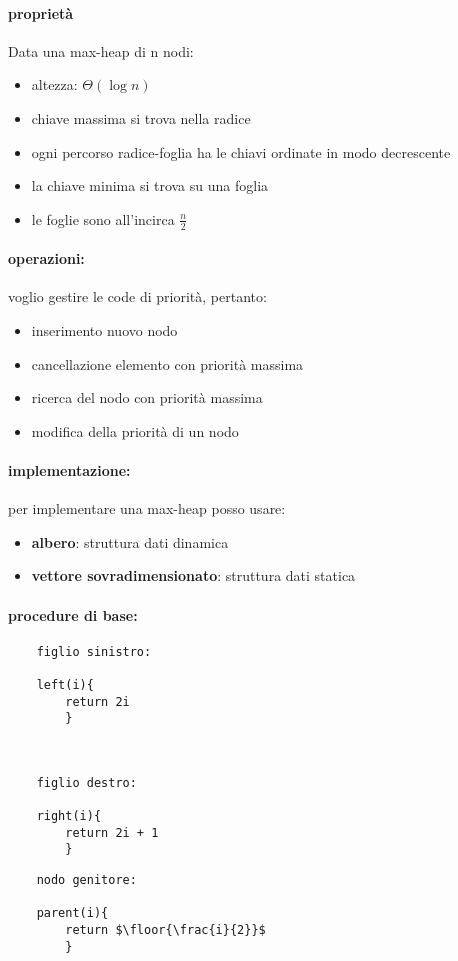 \documentclass{article}
\DeclarePairedDelimiter\floor{\lfloor}{\rfloor}
\begin{document}
\paragraph{proprietà} 
Data una max-heap di n nodi:
\begin{itemize}
    \item altezza: $\Theta(\log n)$
    \item chiave massima si trova nella radice
    \item ogni percorso radice-foglia ha le chiavi ordinate in modo decrescente
    \item la chiave minima si trova su una foglia
    \item le foglie sono all'incirca $\frac{n}{2}$
\end{itemize}

\paragraph{operazioni:}
voglio gestire le code di priorità, pertanto:
\begin{itemize}
    \item inserimento nuovo nodo
    \item cancellazione elemento con priorità massima
    \item ricerca del nodo con priorità massima
    \item modifica della priorità di un nodo
\end{itemize}

\paragraph{implementazione:} per implementare una max-heap posso usare:
\begin{itemize}
    \item \textbf{albero}: struttura dati dinamica 
    \item \textbf{vettore sovradimensionato}: struttura dati statica
\end{itemize}

\paragraph{procedure di base:}

\begin{tabbing}
\begin{lstlisting}
    figlio sinistro:

    left(i){
        return 2i
        } 
\end{lstlisting}
\
\begin{lstlisting}
    figlio destro:

    right(i){
        return 2i + 1
        }
\end{lstlisting}
\begin{lstlisting}
    nodo genitore:

    parent(i){
        return $\floor{\frac{i}{2}}$
        }
\end{lstlisting}
    
\end{tabbing}
\end{document}
